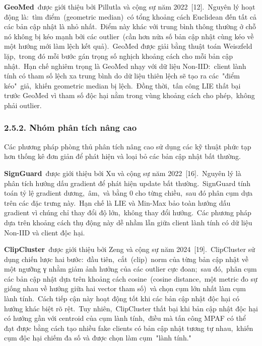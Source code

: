\textbf{GeoMed}~được giới thiệu bởi Pillutla và cộng sự năm 2022~{[}12{]}.~Nguyên lý hoạt động là:~tìm điểm~(geometric median)~có tổng khoảng cách Euclidean đến tất cả các bản cập nhật là nhỏ nhất.~Điểm này khác với trung bình thông thường ở chỗ nó không bị kéo mạnh bởi các outlier~(cần hơn nửa số bản cập nhật cùng kéo về một hướng mới làm lệch kết quả).~GeoMed được giải bằng thuật toán Weiszfeld lặp,~trong đó mỗi bước gán trọng số nghịch khoảng cách cho mỗi bản cập nhật.~Hạn chế nghiêm trọng là GeoMed nhạy với dữ liệu Non-IID:~client lành tính có tham số lệch xa trung bình do dữ liệu thiên lệch sẽ tạo ra các~"điểm kéo"~giả,~khiến geometric median bị lệch.~Đồng thời,~tấn công LIE thất bại trước GeoMed vì tham số độc hại nằm trong vùng khoảng cách cho phép,~không phải outlier.

\subsubsection{2.5.2. Nhóm phân tích nâng cao}\label{nhuxf3m-phuxe2n-tuxedch-nuxe2ng-cao}

Các phương pháp phòng thủ phân tích nâng cao sử dụng các kỹ thuật phức tạp hơn thống kê đơn giản để phát hiện và loại bỏ các bản cập nhật bất thường.

\textbf{SignGuard}~được giới thiệu bởi Xu và cộng sự năm 2022~{[}16{]}.~Nguyên lý là phân tích hướng dấu gradient để phát hiện update bất thường.~SignGuard tính toán tỷ lệ gradient dương,~âm,~và bằng 0 cho từng chiều,~sau đó phân cụm dựa trên các đặc trưng này.~Hạn chế là LIE và Min-Max bảo toàn hướng dấu gradient vì chúng chỉ thay đổi độ lớn,~không thay đổi hướng.~Các phương pháp dựa trên khoảng cách thụ động này dễ nhầm lẫn giữa client lành tính có dữ liệu Non-IID và client độc hại.

\textbf{ClipCluster}~được giới thiệu bởi Zeng và cộng sự năm 2024~{[}19{]}.~ClipCluster sử dụng chiến lược hai bước:~đầu tiên,~cắt~(clip)~norm của từng bản cập nhật về một ngưỡng γ nhằm giảm ảnh hưởng của các outlier cực đoan;~sau đó,~phân cụm các bản cập nhật dựa trên khoảng cách cosine~(cosine distance,~một metric đo sự giống nhau về hướng giữa hai vector tham số)~và chọn cụm lớn nhất làm cụm lành tính.~Cách tiếp cận này hoạt động tốt khi các bản cập nhật độc hại có hướng khác biệt rõ rệt.~Tuy nhiên,~ClipCluster thất bại khi bản cập nhật độc hại có hướng gần với centroid của cụm lành tính,~điều mà tấn công MPAF có thể đạt được bằng cách tạo nhiều fake clients có bản cập nhật tương tự nhau,~khiến cụm độc hại chiếm đa số và được chọn làm cụm~"lành tính."

